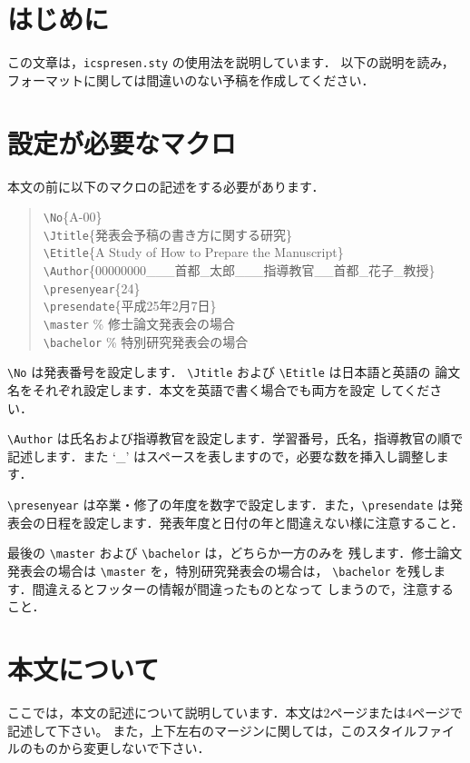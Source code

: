 \documentclass{ltjsarticle}
\begin{document}
\mktitle
%
\renewcommand{\baselinestretch}{1.1}\small
%
\section{はじめに}
この文章は，{\tt icspresen.sty} の使用法を説明しています．
以下の説明を読み，フォーマットに関しては間違いのない予稿を作成してください．

\section{設定が必要なマクロ}

本文の前に以下のマクロの記述をする必要があります．
\newcommand{\tbs}{\textbackslash}
\newcommand{\macrocom}[1]{{\tt \textbackslash#1}}

\begin{quote}
\macrocom{No}\{A-00\}\\
\macrocom{Jtitle}\{発表会予稿の書き方に関する研究\}\\
\macrocom{Etitle}\{A Study of How to Prepare the Manuscript\}\\
\macrocom{Author}\{00000000\_\_\_首都\_太郎\_\_\_指導教官\_\_首都\_花子\_教授\}\\
\macrocom{presenyear}\{24\}\\
\macrocom{presendate}\{平成25年2月7日\}\\
\macrocom{master}   \% 修士論文発表会の場合\\
\macrocom{bachelor} \% 特別研究発表会の場合
\end{quote}

\macrocom{No} は発表番号を設定します．
\macrocom{Jtitle} および \macrocom{Etitle} は日本語と英語の
論文名をそれぞれ設定します．本文を英語で書く場合でも両方を設定
してください．

\macrocom{Author} は氏名および指導教官を設定します．学習番号，氏名，指導教官の順で
記述します．また `\_' はスペースを表しますので，必要な数を挿入し調整します．

\macrocom{presenyear} は卒業・修了の年度を数字で設定します．また，\macrocom{presendate} 
は発表会の日程を設定します．発表年度と日付の年と間違えない様に注意すること．

最後の \macrocom{master} および \macrocom{bachelor} は，どちらか一方のみを
残します．修士論文発表会の場合は \macrocom{master} を，特別研究発表会の場合は，
\macrocom{bachelor} を残します．間違えるとフッターの情報が間違ったものとなって
しまうので，注意すること．

\section{本文について}
ここでは，本文の記述について説明しています．本文は2ページまたは4ページで記述して下さい。
また，上下左右のマージンに関しては，このスタイルファイルのものから変更しないで下さい．
\end{document}
